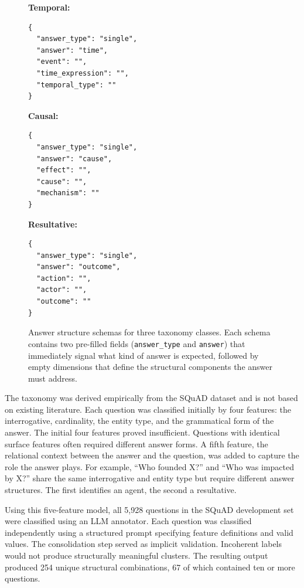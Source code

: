 \documentclass{article}
\begin{document}
\begin{figure}[ht]
\centering
\begin{minipage}[t]{0.30\textwidth}
\textbf{Temporal:}
\begin{verbatim}
{
  "answer_type": "single",
  "answer": "time",
  "event": "",
  "time_expression": "",
  "temporal_type": ""
}
\end{verbatim}
\end{minipage}
\hfill
\begin{minipage}[t]{0.30\textwidth}
\textbf{Causal:}
\begin{verbatim}
{
  "answer_type": "single",
  "answer": "cause",
  "effect": "",
  "cause": "",
  "mechanism": ""
}
\end{verbatim}
\end{minipage}
\hfill
\begin{minipage}[t]{0.30\textwidth}
\textbf{Resultative:}
\begin{verbatim}
{
  "answer_type": "single",
  "answer": "outcome",
  "action": "",
  "actor": "",
  "outcome": ""
}
\end{verbatim}
\end{minipage}
\caption{Answer structure schemas for three taxonomy classes. Each schema contains two pre-filled fields (\texttt{answer\_type} and \texttt{answer}) that immediately signal what kind of answer is expected, followed by empty dimensions that define the structural components the answer must address.}
\label{fig:taxonomy_schemas}
\end{figure}

The taxonomy was derived empirically from the SQuAD dataset and is not based on existing literature. Each question was classified initially by four features: the interrogative, cardinality, the entity type, and the grammatical form of the answer. The initial four features proved insufficient. Questions with identical surface features often required different answer forms. A fifth feature, the relational context between the answer and the question, was added to capture the role the answer plays. For example, ``Who founded X?'' and ``Who was impacted by X?'' share the same interrogative and entity type but require different answer structures. The first identifies an agent, the second a resultative.

Using this five-feature model, all 5,928 questions in the SQuAD development set were classified using an LLM annotator. Each question was classified independently using a structured prompt specifying feature definitions and valid values. The consolidation step served as implicit validation. Incoherent labels would not produce structurally meaningful clusters. The resulting output produced 254 unique structural combinations, 67 of which contained ten or more questions.
\end{document}
